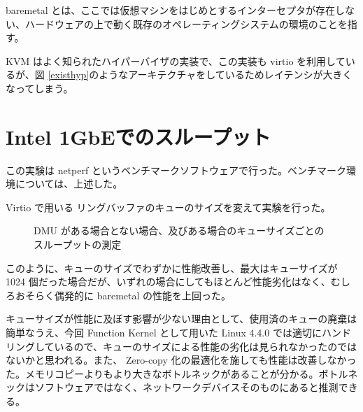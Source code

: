 \documentclass[a4paper,11pt,report]{ltjsbook}
\begin{document}
baremetal とは、ここでは仮想マシンをはじめとするインターセプタが存在しない、ハードウェアの上で動く既存のオペレーティングシステムの環境のことを指す。

KVM はよく知られたハイパーバイザの実装で、この実装も virtio を利用しているが、図 \ref{existhyp}のようなアーキテクチャをしているためレイテンシが大きくなってしまう。

\section{Intel 1GbEでのスループット}

この実験は netperf というベンチマークソフトウェアで行った。ベンチマーク環境については、上述した。

Virtio で用いる リングバッファのキューのサイズを変えて実験を行った。

\begin{figure}[H]
\caption{DMU がある場合とない場合、及びある場合のキューサイズごとのスループットの測定}
\end{figure}

このように、キューのサイズでわずかに性能改善し、最大はキューサイズが 1024 個だった場合だが、いずれの場合にしてもほとんど性能劣化はなく、むしろおそらく偶発的に baremetal の性能を上回った。

キューサイズが性能に及ぼす影響が少ない理由として、使用済のキューの廃棄は簡単なうえ、今回 Function Kernel として用いた Linux 4.4.0 では適切にハンドリングしているので、キューのサイズによる性能の劣化は見られなかったのではないかと思われる。また、 Zero-copy 化の最適化を施しても性能は改善しなかった。メモリコピーよりもより大きなボトルネックがあることが分かる。ボトルネックはソフトウェアではなく、ネットワークデバイスそのものにあると推測できる。
\end{document}
